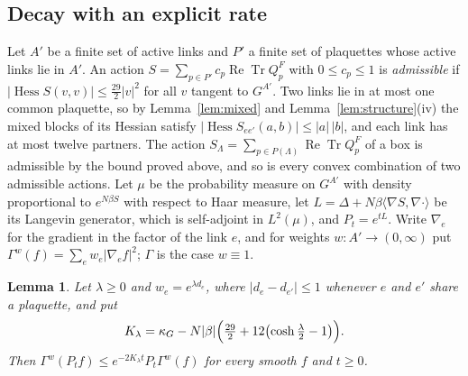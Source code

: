 \documentclass[11pt]{amsart}
\newtheorem{lemma}[theorem]{Lemma}
\theoremstyle{definition}
\theoremstyle{remark}
\numberwithin{equation}{section}
\newcommand{\ReTr}{\operatorname{Re}\operatorname{Tr}}
\newcommand{\Hess}{\operatorname{Hess}}
\newcommand{\ip}[2]{\langle #1,#2\rangle}
\begin{document}
\subsection{Decay with an explicit rate}

Let $A'$ be a finite set of active links and $P'$ a finite set of plaquettes
whose active links lie in $A'$. An action $S=\sum_{p\in P'}c_p\ReTr Q^F_p$
with $0\le c_p\le1$ is \emph{admissible} if $|\Hess S(v,v)|\le\frac{29}2|v|^2$
for all $v$ tangent to $G^{A'}$. Two links lie in at most one common
plaquette, so by Lemma~\ref{lem:mixed} and Lemma~\ref{lem:structure}(iv) the
mixed blocks of its Hessian satisfy
$|\Hess S_{ee'}(a,b)|\le|a|\,|b|$, and each link has at most twelve partners.
The action $S_\Lambda=\sum_{p\in P(\Lambda)}\ReTr Q^F_p$ of a box is
admissible by the bound proved above, and so is every convex combination of
two admissible actions. Let $\mu$ be the probability measure on $G^{A'}$ with
density proportional to $e^{N\beta S}$ with respect to Haar measure, let
$L=\Delta+N\beta\ip{\nabla S}{\nabla\cdot}$ be its Langevin generator, which is
self-adjoint in $L^2(\mu)$, and $P_t=e^{tL}$. Write $\nabla_e$ for the
gradient in the factor of the link $e$, and for weights $w:A'\to(0,\infty)$
put $\Gamma^w(f)=\sum_ew_e|\nabla_ef|^2$; $\Gamma$ is the case $w\equiv1$.

\begin{lemma}\label{lem:weighted}
Let $\lambda\ge0$ and $w_e=e^{\lambda d_e}$, where $|d_e-d_{e'}|\le1$ whenever
$e$ and $e'$ share a plaquette, and put
\[
K_\lambda=\kappa_G-N|\beta|\Bigl(\tfrac{29}2+12\bigl(\cosh\tfrac\lambda2-1\bigr)\Bigr).
\]
Then $\Gamma^w(P_tf)\le e^{-2K_\lambda t}P_t\Gamma^w(f)$ for every smooth $f$ and
$t\ge0$.
\end{lemma}
\end{document}
